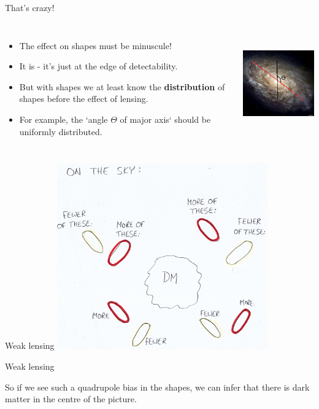 \documentclass[usenames,dvipsnames]{beamer}
\begin{document}
\begin{frame}{That's crazy!}
  \begin{columns}
    \begin{itemize}
      \item{The effect on shapes must be minuscule!}
      \item{It is - it's just at the edge of detectability.}
      \item{But with shapes we at least know the \textbf{distribution} of shapes before the effect of lensing.}
      \item{For example, the `angle $\Theta$ of major axis` should be uniformly distributed.}
    \end{itemize}
    \centering
    \includegraphics[height=4.5cm]{diagram_2.png}
  \end{columns}
\end{frame}

\begin{frame}{Weak lensing}
    \centering
    \includegraphics[height=8cm]{diagram_3.png}
\end{frame}


\begin{frame}{Weak lensing}
  \begin{block}{}
    So if we see such a quadrupole bias in the shapes, we can infer that there is dark matter in the centre of the picture.
  \end{block}
\end{frame}
\end{document}
